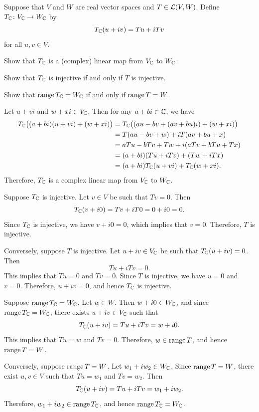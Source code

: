 \begin{exc}
\begin{exercise}
Suppose that $V$ and $W$ are real vector spaces and $T\in\mathcal{L}(V,W)$. Define
$T_{\mathbb{C}}\colon V_{\mathbb{C}}\to W_{\mathbb{C}}$ by
\[ T_{\mathbb{C}}(u+iv)=Tu+iTv \]
for all $u,v\in V$.
\begin{parts}
\item Show that $T_{\mathbb{C}}$ is a (complex) linear map from $V_{\mathbb{C}}$ to $W_{\mathbb{C}}$.
\item Show that $T_{\mathbb{C}}$ is injective if and only if $T$ is injective.
\item Show that $\operatorname{range} T_{\mathbb{C}}=W_{\mathbb{C}}$ if and only if $\operatorname{range} T=W$.
\end{parts}
\end{exercise}
\begin{solution}\leavevmode
\begin{parts}
\item Let $u+vi$ and $w+xi\in V_{\mathbb{C}}$. Then for any $a+bi\in\mathbb{C}$, we have
  \begin{align*}
  T_{\mathbb{C}}\bigl((a+bi)(u+vi)+(w+xi)\bigr)
    &= T_{\mathbb{C}}\bigl((au-bv+(av+bu)i)+(w+xi)\bigr)\\
    &= T(au-bv+w)+iT(av+bu+x)\\
    &= aTu-bTv+Tw+i(aTv+bTu+Tx)\\
    &= (a+bi)(Tu+iTv)+(Tw+iTx)\\
    &= (a+bi)T_{\mathbb{C}}(u+vi)+T_{\mathbb{C}}(w+xi).
  \end{align*}
  Therefore, $T_{\mathbb{C}}$ is a complex linear map from $V_{\mathbb{C}}$ to $W_{\mathbb{C}}$.
\item Suppose $T_{\mathbb{C}}$ is injective. Let $v\in V$ be such that $Tv=0$. Then
  \[ T_{\mathbb{C}}(v+i0)=Tv+iT0=0+i0=0. \]
  Since $T_{\mathbb{C}}$ is injective, we have $v+i0=0$, which implies that $v=0$.
  Therefore, $T$ is injective.

  Conversely, suppose $T$ is injective. Let $u+iv\in V_{\mathbb{C}}$ be such that
  $T_{\mathbb{C}}(u+iv)=0$. Then
  \[ Tu+iTv=0. \]
  This implies that $Tu=0$ and $Tv=0$. Since $T$ is injective, we have $u=0$
  and $v=0$. Therefore, $u+iv=0$, and hence $T_{\mathbb{C}}$ is injective.
\item Suppose $\operatorname{range} T_{\mathbb{C}}=W_{\mathbb{C}}$. Let $w\in W$. Then $w+i0\in W_{\mathbb{C}}$, and
  since $\operatorname{range} T_{\mathbb{C}}=W_{\mathbb{C}}$, there exists $u+iv\in V_{\mathbb{C}}$ such that
  \[ T_{\mathbb{C}}(u+iv)=Tu+iTv=w+i0. \]
  This implies that $Tu=w$ and $Tv=0$. Therefore, $w\in\operatorname{range} T$, and hence
  $\operatorname{range} T=W$.

  Conversely, suppose $\operatorname{range} T=W$. Let $w_1+iw_2\in W_{\mathbb{C}}$. Since
  $\operatorname{range} T=W$, there exist $u,v\in V$ such that $Tu=w_1$ and $Tv=w_2$. Then
  \[ T_{\mathbb{C}}(u+iv)=Tu+iTv=w_1+iw_2. \]
  Therefore, $w_1+iw_2\in\operatorname{range} T_{\mathbb{C}}$, and hence $\operatorname{range} T_{\mathbb{C}}=W_{\mathbb{C}}$.
\end{parts}
\end{solution}
\end{exc}
